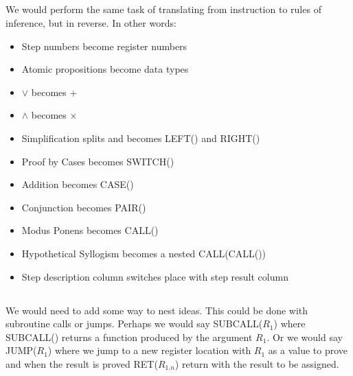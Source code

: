 \documentclass[11pt]{article}
\begin{document}
\subsection{} %
We would perform the same task of translating from instruction to rules of inference, but in reverse. In other words:
\begin{itemize}
	\item Step numbers become register numbers
	\item Atomic propositions become data types
	\item $\lor$ becomes +
	\item $\land$ becomes $\times$
	\item Simplification splits and becomes LEFT() and RIGHT()
	\item Proof by Cases becomes SWITCH()
	\item Addition becomes CASE()
	\item Conjunction becomes PAIR()
	\item Modus Ponens becomes CALL()
	\item Hypothetical Syllogism becomes a nested CALL(CALL())
	\item Step description column switches place with step result column
\end{itemize}

\subsection{} %
We would need to add some way to nest ideas. This could be done with subroutine calls or jumps. Perhaps we would say SUBCALL($R_1$) where SUBCALL() returns a function produced by the argument $R_1$. Or we would say JUMP($R_1$) where we jump to a new register location with $R_1$ as a value to prove and when the result is proved RET($R_{1.n}$) return with the result to be assigned. 
\end{document}
